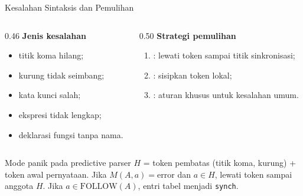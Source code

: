 \documentclass[aspectratio=169,10pt,t]{beamer}
\begin{document}
\begin{frame}{Kesalahan Sintaksis dan Pemulihan}
  \begin{columns}[T,onlytextwidth]
    \begin{column}{0.46\textwidth}
      \textbf{Jenis kesalahan}
      \begin{itemize}
        \item titik koma hilang;
        \item kurung tidak seimbang;
        \item kata kunci salah;
        \item ekspresi tidak lengkap;
        \item deklarasi fungsi tanpa nama.
      \end{itemize}
    \end{column}
    \begin{column}{0.50\textwidth}
      \textbf{Strategi pemulihan}
      \begin{enumerate}
        \item {}: lewati token sampai titik sinkronisasi;
        \item {}: sisipkan token lokal;
        \item {}: aturan khusus untuk kesalahan
              umum.
      \end{enumerate}
    \end{column}
  \end{columns}

  \vspace{4pt}
  \begin{block}{Mode panik pada predictive parser}
    \footnotesize
    \(H\) = token pembatas (titik koma, kurung) + token awal
    pernyataan. Jika \(M(A,a)=\text{error}\) dan \(a \in H\), lewati
    token sampai anggota \(H\). Jika \(a \in \mathrm{FOLLOW}(A)\),
    entri tabel menjadi \texttt{synch}.
  \end{block}
\end{frame}
\end{document}
